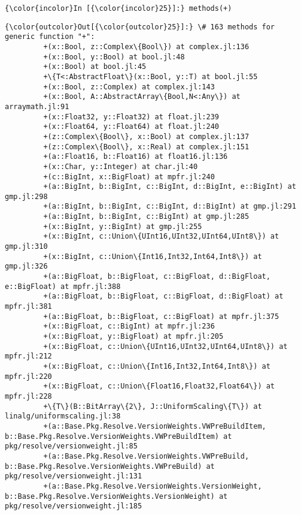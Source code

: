 \documentclass[11pt]{article}
\begin{document}
    \begin{Verbatim}[commandchars=\\\{\}]
{\color{incolor}In [{\color{incolor}25}]:} methods(+)
\end{Verbatim}

            \begin{Verbatim}[commandchars=\\\{\}]
{\color{outcolor}Out[{\color{outcolor}25}]:} \# 163 methods for generic function "+":
         +(x::Bool, z::Complex\{Bool\}) at complex.jl:136
         +(x::Bool, y::Bool) at bool.jl:48
         +(x::Bool) at bool.jl:45
         +\{T<:AbstractFloat\}(x::Bool, y::T) at bool.jl:55
         +(x::Bool, z::Complex) at complex.jl:143
         +(x::Bool, A::AbstractArray\{Bool,N<:Any\}) at arraymath.jl:91
         +(x::Float32, y::Float32) at float.jl:239
         +(x::Float64, y::Float64) at float.jl:240
         +(z::Complex\{Bool\}, x::Bool) at complex.jl:137
         +(z::Complex\{Bool\}, x::Real) at complex.jl:151
         +(a::Float16, b::Float16) at float16.jl:136
         +(x::Char, y::Integer) at char.jl:40
         +(c::BigInt, x::BigFloat) at mpfr.jl:240
         +(a::BigInt, b::BigInt, c::BigInt, d::BigInt, e::BigInt) at gmp.jl:298
         +(a::BigInt, b::BigInt, c::BigInt, d::BigInt) at gmp.jl:291
         +(a::BigInt, b::BigInt, c::BigInt) at gmp.jl:285
         +(x::BigInt, y::BigInt) at gmp.jl:255
         +(x::BigInt, c::Union\{UInt16,UInt32,UInt64,UInt8\}) at gmp.jl:310
         +(x::BigInt, c::Union\{Int16,Int32,Int64,Int8\}) at gmp.jl:326
         +(a::BigFloat, b::BigFloat, c::BigFloat, d::BigFloat, e::BigFloat) at mpfr.jl:388
         +(a::BigFloat, b::BigFloat, c::BigFloat, d::BigFloat) at mpfr.jl:381
         +(a::BigFloat, b::BigFloat, c::BigFloat) at mpfr.jl:375
         +(x::BigFloat, c::BigInt) at mpfr.jl:236
         +(x::BigFloat, y::BigFloat) at mpfr.jl:205
         +(x::BigFloat, c::Union\{UInt16,UInt32,UInt64,UInt8\}) at mpfr.jl:212
         +(x::BigFloat, c::Union\{Int16,Int32,Int64,Int8\}) at mpfr.jl:220
         +(x::BigFloat, c::Union\{Float16,Float32,Float64\}) at mpfr.jl:228
         +\{T\}(B::BitArray\{2\}, J::UniformScaling\{T\}) at linalg/uniformscaling.jl:38
         +(a::Base.Pkg.Resolve.VersionWeights.VWPreBuildItem, b::Base.Pkg.Resolve.VersionWeights.VWPreBuildItem) at pkg/resolve/versionweight.jl:85
         +(a::Base.Pkg.Resolve.VersionWeights.VWPreBuild, b::Base.Pkg.Resolve.VersionWeights.VWPreBuild) at pkg/resolve/versionweight.jl:131
         +(a::Base.Pkg.Resolve.VersionWeights.VersionWeight, b::Base.Pkg.Resolve.VersionWeights.VersionWeight) at pkg/resolve/versionweight.jl:185

\end{Verbatim}
\end{document}
